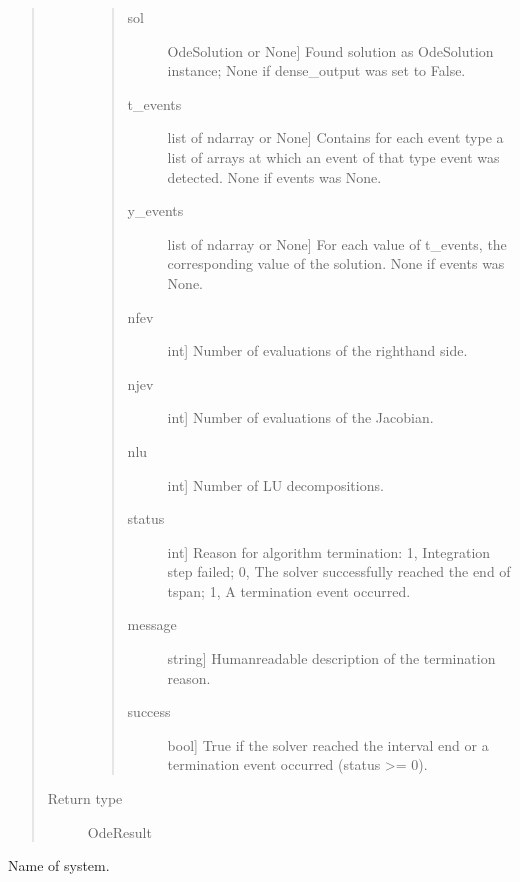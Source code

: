 \documentclass[a4paper,landscape,10pt,english]{sphinxmanual}
\begin{document}
\begin{fulllineitems}
\begin{fulllineitems}
\begin{quote}
\begin{description}
\begin{quote}
\begin{description}
\item[{sol}] \leavevmode{[}OdeSolution or None{]}
Found solution as OdeSolution instance; None if
dense\_output was set to False.

\item[{t\_events}] \leavevmode{[}list of ndarray or None{]}
Contains for each event type a list of arrays at which an
event of that type event was detected. None if events was
None.

\item[{y\_events}] \leavevmode{[}list of ndarray or None{]}
For each value of t\_events, the corresponding value of the
solution. None if events was None.

\item[{nfev}] \leavevmode{[}int{]}
Number of evaluations of the right\sphinxhyphen{}hand side.

\item[{njev}] \leavevmode{[}int{]}
Number of evaluations of the Jacobian.

\item[{nlu}] \leavevmode{[}int{]}
Number of LU decompositions.

\item[{status}] \leavevmode{[}int{]}
Reason for algorithm termination: \sphinxhyphen{}1, Integration step
failed; 0, The solver successfully reached the end of
tspan; 1, A termination event occurred.

\item[{message}] \leavevmode{[}string{]}
Human\sphinxhyphen{}readable description of the termination reason.

\item[{success}] \leavevmode{[}bool{]}
True if the solver reached the interval end or a
termination event occurred (status \textgreater{}= 0).

\end{description}
\end{quote}


\item[{Return type}] \leavevmode
OdeResult

\end{description}\end{quote}

\end{fulllineitems}


\begin{fulllineitems}
\label{\detokenize{code_docs/simulation_API.simulation:simulation_API.simulation.simulations.Simulation.system}}
Name of system.

\end{fulllineitems}


\end{fulllineitems}
\end{document}
